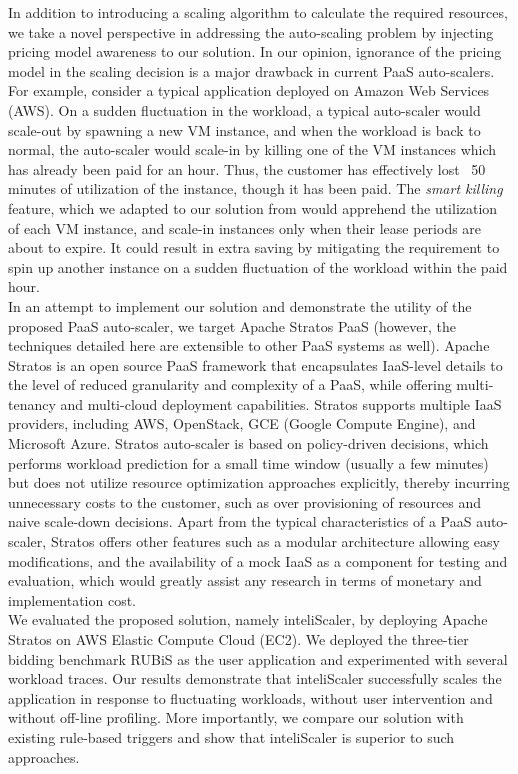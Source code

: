 In addition to introducing a scaling algorithm to calculate the required resources, we take a novel perspective in addressing the auto-scaling problem by injecting pricing model awareness to our solution. In our opinion, ignorance of the pricing model in the scaling decision is a major drawback in current PaaS auto-scalers. For example, consider a typical application deployed on Amazon Web Services (AWS). On a sudden fluctuation in the workload, a typical auto-scaler would scale-out by spawning a new VM instance, and when the workload is back to normal, the auto-scaler would scale-in by killing one of the VM instances which has already been paid for an hour. Thus, the customer has effectively lost ~50 minutes of utilization of the instance, though it has been paid. The \textit{smart killing} feature, which we adapted to our solution from \cite{} would apprehend the utilization of each VM instance, and scale-in instances only when their lease periods are about to expire. It could result in extra saving by mitigating the requirement to spin up another instance on a sudden fluctuation of the workload within the paid hour.\\

In an attempt to implement our solution and demonstrate the utility of the proposed PaaS auto-scaler, we target Apache Stratos PaaS (however, the techniques detailed here are extensible to other PaaS systems as well). Apache Stratos is an open source PaaS framework that encapsulates IaaS-level details to the level of reduced granularity and complexity of a PaaS, while offering multi-tenancy and multi-cloud deployment capabilities. Stratos supports multiple IaaS providers, including AWS, OpenStack, GCE (Google Compute Engine), and Microsoft Azure\cite{website:stratos}. Stratos auto-scaler is based on policy-driven decisions, which performs workload prediction for a small time window (usually a few minutes) but does not utilize resource optimization approaches explicitly, thereby incurring unnecessary costs to the customer, such as over provisioning of resources and naive scale-down decisions. Apart from the typical characteristics of a PaaS auto-scaler, Stratos offers other features such as a modular architecture allowing easy modifications, and the availability of a mock IaaS as a component for testing and evaluation, which would greatly assist any research in terms of monetary and implementation cost.\\

We evaluated the proposed solution, namely inteliScaler, by deploying Apache Stratos on AWS Elastic Compute Cloud (EC2). We deployed the three-tier bidding benchmark RUBiS as the user application and experimented with several workload traces. Our results demonstrate that inteliScaler successfully scales the application in response to fluctuating workloads, without user intervention and without off-line profiling. More importantly, we compare our solution with existing rule-based triggers and show that inteliScaler is superior to such approaches.\\

